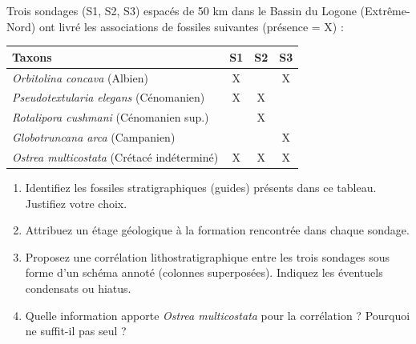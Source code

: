 \documentclass[11pt]{article}
\begin{document}
\begin{exercice}
Trois sondages (S1, S2, S3) espacés de 50 km dans le Bassin du Logone (Extrême-Nord) ont livré les associations de fossiles suivantes (présence = X) :

\begin{tabular}{lccc}
\hline
\textbf{Taxons} & \textbf{S1} & \textbf{S2} & \textbf{S3} \\
\hline
\textit{Orbitolina concava} (Albien) & X &  & X \\
\textit{Pseudotextularia elegans} (Cénomanien) & X & X &  \\
\textit{Rotalipora cushmani} (Cénomanien sup.) &  & X &  \\
\textit{Globotruncana arca} (Campanien) &  &  & X \\
\textit{Ostrea multicostata} (Crétacé indéterminé) & X & X & X \\
\hline
\end{tabular}

\begin{enumerate}
    \item Identifiez les fossiles stratigraphiques (guides) présents dans ce tableau. Justifiez votre choix.
    \item Attribuez un étage géologique à la formation rencontrée dans chaque sondage.
    \item Proposez une corrélation lithostratigraphique entre les trois sondages sous forme d'un schéma annoté (colonnes superposées). Indiquez les éventuels condensats ou hiatus.
    \item Quelle information apporte \textit{Ostrea multicostata} pour la corrélation ? Pourquoi ne suffit-il pas seul ?
\end{enumerate}
\end{exercice}
\end{document}
